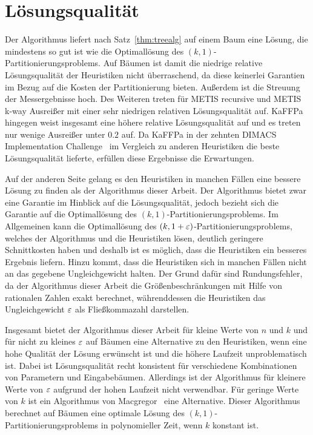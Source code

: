 \section{Lösungsqualität}
Der Algorithmus liefert nach Satz~\ref{thm:treealg} auf einem Baum eine Lösung, die mindestens so gut ist wie die Optimallösung des $(k, 1)$\hyp Partitionierungsproblems.
Auf Bäumen ist damit die niedrige relative Lösungsqualität der Heuristiken nicht überraschend, da diese keinerlei Garantien im Bezug auf die Kosten der Partitionierung bieten.
Außerdem ist die Streuung der Messergebnisse hoch. 
Des Weiteren treten für METIS recursive und METIS k-way Ausreißer mit einer sehr niedrigen relativen Lösungsqualität auf.
KaFFPa hingegen weist insgesamt eine höhere relative Lösungsqualität auf und es treten nur wenige Ausreißer unter $0.2$ auf.
Da KaFFPa in der zehnten DIMACS Implementation Challenge~\cite{BMS+13} im Vergleich zu anderen Heuristiken die beste Lösungsqualität lieferte, erfüllen diese Ergebnisse die Erwartungen.

Auf der anderen Seite gelang es den Heuristiken in manchen Fällen eine bessere Lösung zu finden als der Algorithmus dieser Arbeit.
Der Algorithmus bietet zwar eine Garantie im Hinblick auf die Lösungsqualität, jedoch bezieht sich die Garantie auf die Optimallösung des $(k,1)$\hyp Partitionierungsproblems.
Im Allgemeinen kann die Optimallösung des $(k, 1+\varepsilon)$\hyp Partitionierungsproblems, welches der Algorithmus und die Heuristiken lösen, deutlich geringere Schnittkosten haben und deshalb ist es möglich, dass die Heuristiken ein besseres Ergebnis liefern.
Hinzu kommt, dass die Heuristiken sich in manchen Fällen nicht an das gegebene Ungleichgewicht halten.
Der Grund dafür sind Rundungsfehler, da der Algorithmus dieser Arbeit die Größenbeschränkungen mit Hilfe von rationalen Zahlen exakt berechnet, währenddessen die Heuristiken das Ungleichgewicht $\varepsilon$ als Fließkommazahl darstellen.

Insgesamt bietet der Algorithmus dieser Arbeit für kleine Werte von $n$ und $k$ und für nicht zu kleines $\varepsilon$ auf Bäumen eine Alternative zu den Heuristiken, wenn eine hohe Qualität der Lösung erwünscht ist und die höhere Laufzeit unproblematisch ist.
Dabei ist Lösungsqualität recht konsistent für verschiedene Kombinationen von Parametern und Eingabebäumen.
Allerdings ist der Algorithmus für kleinere Werte von $\varepsilon$ aufgrund der hohen Laufzeit nicht verwendbar.
Für geringe Werte von $k$ ist ein Algorithmus von Macgregor~\cite{mcg78} eine Alternative.
Dieser Algorithmus berechnet auf Bäumen eine optimale Lösung des $(k,1)$\hyp Partitionierungsproblems in polynomieller Zeit, wenn $k$ konstant ist.

